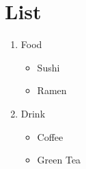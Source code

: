 \documentclass[pdflatex, a4paper, 10pt, jadriver=standard]{bxjsarticle}
\begin{document}
\section*{\Large List}
    
\begin{enumerate}
     \item Food
		 
\begin{itemize}
			  \item Sushi
			  \item Ramen
		
\end{itemize}
	
     \item Drink
		 
\begin{itemize}
			  \item Coffee
			  \item Green Tea
		
\end{itemize}
	
    
\end{enumerate}
    
\end{document}
